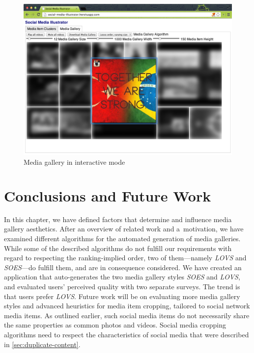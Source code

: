 \begin{figure}[!ht]
  \centering
  \includegraphics[width=1\columnwidth]{app5.png}
  \caption{Media gallery in interactive mode}
  \label{fig:mediagallerycompilation2}
\end{figure}

\section{Conclusions and Future Work}

In this chapter, we have defined factors that determine and influence
media gallery aesthetics.
After an overview of related work and a~motivation,
we have examined different algorithms for the automated generation
of media galleries.
While some of the described algorithms do not fulfill our requirements
with regard to respecting the ranking-implied order,
two of them---namely \emph{LOVS} and \emph{SOES}---do fulfill them,
and are in consequence considered.
We have created an application that auto-generates the
two media gallery styles \emph{SOES} and \emph{LOVS},
and evaluated users' perceived quality with two separate surveys. 
The trend is that users prefer \emph{LOVS}.
Future work will be on evaluating more media gallery styles
and advanced heuristics for media item cropping,
tailored to social network media items.
As outlined earlier, such social media items
do not necessarily share the same properties as
common photos and videos.
Social media cropping algorithms need to respect 
the characteristics of social media
that were described in \autoref{sec:duplicate-content}.

